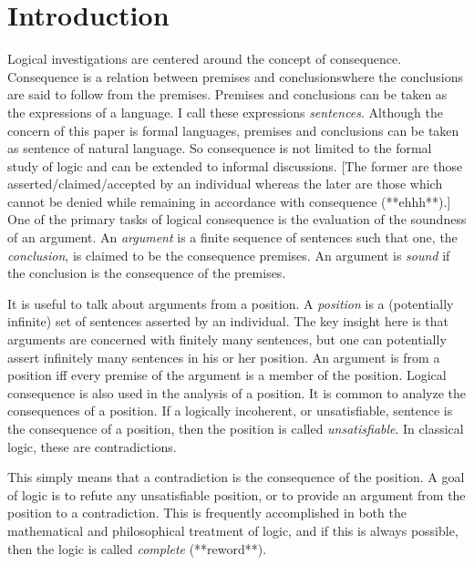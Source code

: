 \documentclass[12pt]{article}
\theoremstyle{definition}
\theoremstyle{remark}
\begin{document}
\maketitle

\section{Introduction}

Logical investigations are centered around the concept of consequence. Consequence is a relation between premises and conclusionswhere the conclusions are said to follow from the premises. Premises and conclusions can be taken as the expressions of a language. I call these expressions \textit{sentences}. Although the concern of this paper is formal  languages, premises and conclusions can be taken as sentence of natural language. So consequence is not limited to the formal study of logic and can be extended to informal discussions. [The former are those asserted/claimed/accepted by an individual whereas the later are those which cannot be denied while remaining in accordance with consequence (**ehhh**).] One of the primary tasks of logical consequence is the evaluation of the soundness of an argument. An \textit{argument} is a finite sequence of sentences such that one, the \textit{conclusion}, is claimed to be the consequence premises. An argument is \textit{sound} if the conclusion is the consequence of the premises.

It is useful to talk about arguments from a position. A \textit{position} is a (potentially infinite) set of sentences asserted by an individual. The key insight here is that arguments are concerned with finitely many sentences, but one can potentially assert infinitely many sentences in his or her position. An argument is from a position iff every premise of the argument is a member of the position. Logical consequence is also used in the analysis of a position. It is common to analyze the consequences of a position. If a logically incoherent, or unsatisfiable, sentence is the consequence of a position, then the position is called \textit{unsatisfiable}. In classical logic, these are contradictions. 

This simply means that a contradiction is the consequence of the position. A goal of logic is to refute any unsatisfiable position, or to provide an argument from the position to a contradiction. This is frequently accomplished in both the mathematical and philosophical treatment of logic, and if this is always possible, then the logic is called \textit{complete} (**reword**).
\end{document}
